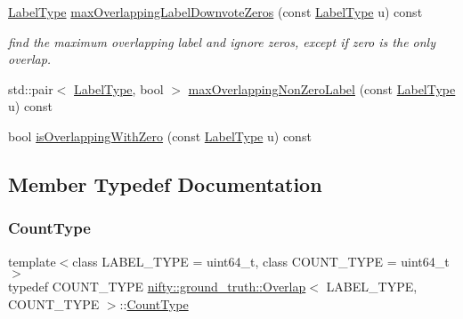 \begin{DoxyCompactItemize}
\item 
\hyperlink{classnifty_1_1ground__truth_1_1Overlap_af14b9a872d3736d3115231866bc71612}{Label\+Type} \hyperlink{classnifty_1_1ground__truth_1_1Overlap_adecf7066f58c63a0f4d252102221cf82}{max\+Overlapping\+Label\+Downvote\+Zeros} (const \hyperlink{classnifty_1_1ground__truth_1_1Overlap_af14b9a872d3736d3115231866bc71612}{Label\+Type} u) const
\begin{DoxyCompactList}\small\item\em find the maximum overlapping label and ignore zeros, except if zero is the only overlap. \end{DoxyCompactList}\item 
std\+::pair$<$ \hyperlink{classnifty_1_1ground__truth_1_1Overlap_af14b9a872d3736d3115231866bc71612}{Label\+Type}, bool $>$ \hyperlink{classnifty_1_1ground__truth_1_1Overlap_a1998f00758eb55011a8b91f47f092810}{max\+Overlapping\+Non\+Zero\+Label} (const \hyperlink{classnifty_1_1ground__truth_1_1Overlap_af14b9a872d3736d3115231866bc71612}{Label\+Type} u) const
\item 
bool \hyperlink{classnifty_1_1ground__truth_1_1Overlap_a29459ce889cbfb9fda869817b8e9199b}{is\+Overlapping\+With\+Zero} (const \hyperlink{classnifty_1_1ground__truth_1_1Overlap_af14b9a872d3736d3115231866bc71612}{Label\+Type} u) const
\end{DoxyCompactItemize}


\subsection{Member Typedef Documentation}
\mbox{\label{classnifty_1_1ground__truth_1_1Overlap_ab8f82b8fef890dc3d7b69da0cc768c76}} 
\subsubsection{\texorpdfstring{Count\+Type}{CountType}}
{\footnotesize\ttfamily template$<$class L\+A\+B\+E\+L\+\_\+\+T\+Y\+PE  = uint64\+\_\+t, class C\+O\+U\+N\+T\+\_\+\+T\+Y\+PE  = uint64\+\_\+t$>$ \\
typedef C\+O\+U\+N\+T\+\_\+\+T\+Y\+PE \hyperlink{classnifty_1_1ground__truth_1_1Overlap}{nifty\+::ground\+\_\+truth\+::\+Overlap}$<$ L\+A\+B\+E\+L\+\_\+\+T\+Y\+PE, C\+O\+U\+N\+T\+\_\+\+T\+Y\+PE $>$\+::\hyperlink{classnifty_1_1ground__truth_1_1Overlap_ab8f82b8fef890dc3d7b69da0cc768c76}{Count\+Type}}

